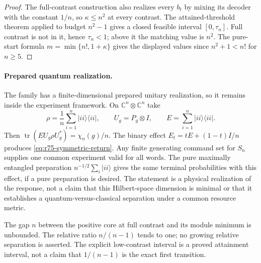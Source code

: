 \begin{proof}
The full-contrast construction also realizes every $b_t$ by
mixing its decoder with the constant $1/n$, so $\kappa\le n^2$
at every contrast. The attained-threshold theorem applied to
budget $n^2-1$ gives a closed feasible interval
$[0,\tau_n]$. Full contrast is not in it, hence $\tau_n<1$;
above it the matching value is $n^2$. The pure-start formula
$m=\min\{n!,1+\kappa\}$ gives the displayed values since
$n^2+1<n!$ for $n\ge5$.
\end{proof}

\paragraph{Prepared quantum realization.}
The family has a finite-dimensional prepared unitary realization,
so it remains inside the experiment framework. On
$\mathbb C^n\otimes\mathbb C^n$ take
\[
 \rho=\frac1n\sum_{i=1}^n|ii\rangle\langle ii|,
 \qquad U_g=P_g\otimes I,
 \qquad E=\sum_{i=1}^n|ii\rangle\langle ii|.
\]
Then $\operatorname{tr}(E U_g\rho U_g^*)=\chi_n(g)/n$.
The binary effect $E_t=tE+(1-t)I/n$ produces
\eqref{eq:r75-symmetric-return}. Any finite generating command set
for $S_n$ supplies one common experiment valid for all words.
The pure maximally entangled preparation
$n^{-1/2}\sum_i|ii\rangle$ gives the same terminal probabilities
with this effect, if a pure preparation is desired. The statement
is a physical realization of the response, not a claim that this
Hilbert-space dimension is minimal or that it establishes a
quantum-versus-classical separation under a common resource metric.

The gap $n$ between the positive core at full contrast and its
module minimum is unbounded. The relative ratio $n/(n-1)$ tends
to one; no growing relative separation is asserted. The explicit
low-contrast interval is a proved attainment interval, not a claim
that $1/(n-1)$ is the exact first transition.
